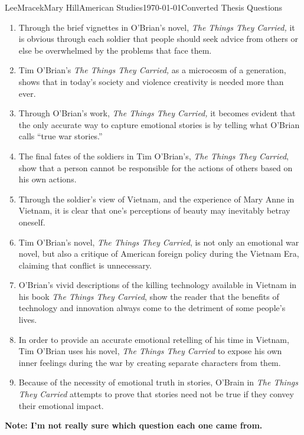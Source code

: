 \documentclass[letterpaper,11pt]{article}
\begin{document}
\begin{mla}{Lee}{Mracek}{Mary Hill}{American Studies}{\today}{Converted Thesis Questions}
    \begin{enumerate}
        \item Through the brief vignettes in O'Brian's novel, \textit{The Things They Carried,} it is obvious through each soldier that people should seek advice from others or else be overwhelmed by the problems that face them.

        \item Tim O'Brian's \textit{The Things They Carried,} as a microcosm of a generation, shows that in today's society and violence creativity is needed more than ever.

        \item Through O'Brian's work, \textit{The Things They Carried,} it becomes evident that the only accurate way to capture emotional stories is by telling what O'Brian calls ``true war stories.''

        \item The final fates of the soldiers in Tim O'Brian's, \textit{The Things They Carried}, show that a person cannot be responsible for the actions of others based on his own actions.
        \item Through the soldier's view of Vietnam, and the experience of Mary Anne in Vietnam, it is clear that one's perceptions of beauty may inevitably betray oneself. 

        \item Tim O'Brian's novel, \textit{The Things They Carried}, is not only an emotional war novel, but also a critique of American foreign policy during the Vietnam Era, claiming that conflict is unnecessary.

        \item O'Brian's vivid descriptions of the killing technology available in Vietnam in his book \textit{The Things They Carried}, show the reader that the benefits of technology and innovation always come to the detriment of some people's lives.

        \item In order to provide an accurate emotional retelling of his time in Vietnam, Tim O'Brian uses his novel, \textit{The Things They Carried} to expose his own inner feelings during the war by creating separate characters from them.

        \item Because of the necessity of emotional truth in stories, O'Brain in \textit{The Things They Carried} attempts to prove that stories need not be true if they convey their emotional impact.
    \end{enumerate}

    \textbf{Note: I'm not really sure which question each one came from.}
\end{mla}
\end{document}
